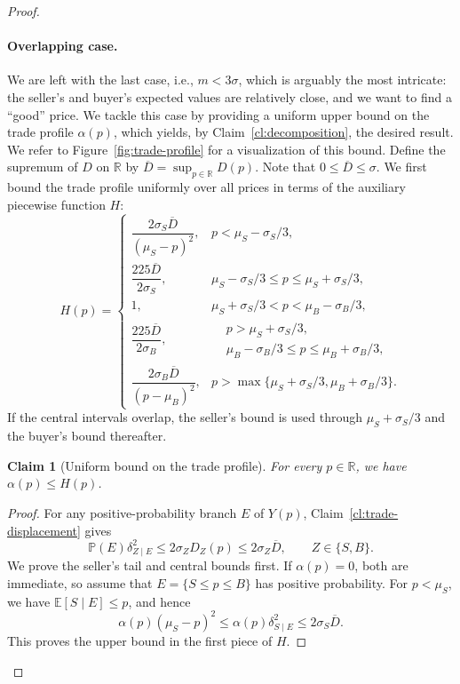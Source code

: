 \documentclass[11pt]{article}
\newtheorem{claim}[theorem]{Claim}
\newcommand{\E}[1]{\mathbb E\left[#1\right]}
\newcommand{\R}{\mathbb R}
\begin{document}
\begin{proof}
\paragraph{Overlapping case.} We are left with the last case, i.e., $m < 3 \sigma$, which is arguably the most intricate: {the seller's and buyer's expected values} are relatively close, and we want to find a ``good'' price. We tackle this case by providing {a uniform} upper bound on the trade profile $\alpha(p)${, which} yields, by Claim~\ref{cl:decomposition}{,} the desired result. We refer to Figure~\ref{fig:trade-profile} for a visualization of this bound. {Define the supremum of $D$ on ${\R}$ by} $
 \overline D=\sup_{p\in\R}D(p).
$ {Note that} $0\le\overline D\le\sigma$. We first bound the trade profile uniformly over all prices {in terms of} the auxiliary {piecewise} function $H:$
\[
H(p)=
 \begin{cases}
  \dfrac{2\sigma_S\overline D}{(\mu_S-p)^2},
    & p<\mu_S-\sigma_S/3,\\[6pt]
  \dfrac{225\overline D}{2\sigma_S},
    & \mu_S-\sigma_S/3\le p\le\mu_S+\sigma_S/3,\\[6pt]
  1,
    & \mu_S+\sigma_S/3<p<\mu_B-\sigma_B/3,\\[6pt]
  \dfrac{225\overline D}{2\sigma_B},
    & \begin{aligned}
        &p>\mu_S+\sigma_S/3,\\
        &\mu_B-\sigma_B/3\le p\le\mu_B+\sigma_B/3,
      \end{aligned}\\[6pt]
  \dfrac{2\sigma_B\overline D}{(p-\mu_B)^2},
    & p>\max\{\mu_S+\sigma_S/3,\mu_B+\sigma_B/3\}.
 \end{cases}
\]
If the central intervals overlap, the seller's bound is used through $\mu_S+\sigma_S/3$ and the buyer's bound thereafter.
\begin{claim}[Uniform bound on the trade profile]\label{cl:trade-profile}
For every $p\in\R$, {we have} 
\(
\alpha(p)\le H(p)
 \){.}
\end{claim}
\begin{proof}
For any positive-probability branch $E$ of $Y(p)$, Claim~\ref{cl:trade-displacement} gives
\[
 \mathbb P(E)\delta_{Z\mid E}^2
 \le2\sigma_ZD_Z(p)\le2\sigma_Z\overline D,
 \qquad Z\in\{S,B\}.
\]
We prove the seller's tail and central bounds first. If $\alpha(p)=0$, both are immediate, so assume that $E=\{S\le p\le B\}$ has positive probability. For $p<\mu_S$, we have $\E{S\mid E}\le p$, and hence
\[
 \alpha(p)(\mu_S-p)^2
 \le\alpha(p)\delta_{S\mid E}^2
 \le2\sigma_S\overline D.
\]
This proves the upper bound in the first piece of $H$.


\end{proof}
\end{proof}
\end{document}
